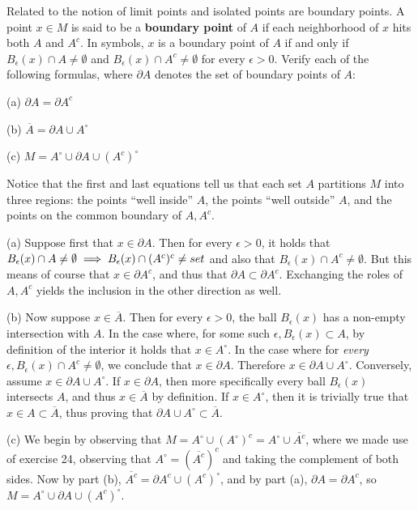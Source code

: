 \begin{exercise}{41}
    Related to the notion of limit points and isolated points are boundary points.
    A point $x \in M$ is said to be a \textbf{boundary point} of $A$ if each neighborhood of $x$ hits both $A$ and $A^c$.
    In symbols, $x$ is a boundary point of $A$ if and only if $B_{\epsilon}(x) \cap A \neq \emptyset$ and $B_{\epsilon}(x) \cap A^c \neq \emptyset$ for every $\epsilon > 0$.
    Verify each of the following formulas, where $\partial A$ denotes the set of boundary points of $A$:

    (a) $\partial A = \partial A^c$

    (b) $\overline{{A}} = \partial A \cup A^{\circ}$

    (c) $M = A^\circ \cup \partial A \cup ({A^{c}})^{\circ}$

    Notice that the first and last equations tell us that each set $A$ partitions $M$ into three regions: the points ``well inside'' $A$, the points ``well outside'' $A$, and the points on the common boundary of $A, A^{c}$.

\end{exercise}

\begin{solution}
    
    (a) Suppose first that $x \in \partial A$.
    Then for every $\epsilon > 0$, it holds that $B_{\epsilon}(x) \cap A \neq \emptyset \implies B_{\epsilon}(x) \cap (A^c)^c \neq \empty set$ and also that $B_{\epsilon}(x) \cap A^c \neq \emptyset$.
    But this means of course that $x \in \partial A^c$, and thus that $\partial A \subset \partial A^c$.
    Exchanging the roles of $A, A^c$ yields the inclusion in the other direction as well.

    (b) Now suppose $x \in \overline{A}$.
    Then for every $\epsilon > 0$, the ball $B_{\epsilon}(x)$ has a non-empty intersection with $A$.
    In the case where, for some such $\epsilon, B_{\epsilon}(x) \subset A$, by definition of the interior it holds that $x \in A^\circ$.
    In the case where for \textit{every} $\epsilon, B_{\epsilon}(x) \cap A^c \neq \emptyset$, we conclude that $x \in \partial A$.
    Therefore $x \in \partial A \cup A^\circ$.
    Conversely, assume $x \in \partial A \cup A^\circ$.
    If $x \in \partial A$, then more specifically every ball $B_{\epsilon}(x)$ intersects $A$, and thus $x \in \overline{A}$ by definition.
    If $x \in A^\circ$, then it is trivially true that $x \in A \subset \overline{A}$, thus proving that $\partial A \cup A^\circ \subset \overline{A}$.

    (c) We begin by observing that $M = A^\circ \cup (A^\circ)^c = A^\circ \cup \overline{A^c}$, where we made use of exercise 24, observing that $A^\circ = (\overline{A^c})^c$ and taking the complement of both sides.
    Now by part (b), $\overline{A^c} = \partial A^c \cup (A^c)^\circ$, and by part (a), $\partial A = \partial A^c$, so $M = A^\circ \cup \partial A \cup (A^c)^\circ$.
\end{solution}

